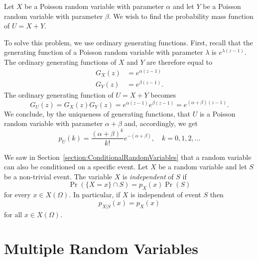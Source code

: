 \begin{example}
Let $X$ be a Poisson random variable with parameter $\alpha$ and let $Y$ be a Poisson random variable with parameter $\beta$.
We wish to find the probability mass function of $U = X + Y$.

To solve this problem, we use ordinary generating functions.
First, recall that the generating function of a Poisson random variable with parameter $\lambda$ is $e^{\lambda (z-1)}$.
The ordinary generating functions of $X$ and $Y$ are therefore equal to
\begin{align*}
G_X (z) &= e^{\alpha (z-1)} \\
G_Y (z) &= e^{\beta (z-1)} .
\end{align*}
The ordinary generating function of $U = X + Y$ becomes
\begin{equation*}
G_U (z) = G_X (z) G_Y(z) = e^{\alpha (z-1)} e^{\beta (z-1)}
= e^{(\alpha + \beta) (z-1)} .
\end{equation*}
We conclude, by the uniqueness of generating functions, that $U$ is a Poisson random variable with parameter $\alpha + \beta$ and, accordingly, we get
\begin{equation*}
p_U (k) = \frac{ (\alpha + \beta)^k }{k!} e^{- (\alpha + \beta) },
\quad k = 0, 1, 2, \ldots
\end{equation*}
\end{example}

We saw in Section~\ref{section:ConditionalRandomVariables} that a random variable can also be conditioned on a specific event.
Let $X$ be a random variable and let $S$ be a non-trivial event.
The variable $X$ is \emph{independent} of $S$ if
\begin{equation*}
\Pr (\{X = x \} \cap S ) = p_X (x) \Pr (S)
\end{equation*}
for every $x \in X(\Omega)$.
In particular, if $X$ is independent of event $S$ then
\begin{equation*}
p_{X|S} (x) = p_X (x)
\end{equation*}
for all $x \in X(\Omega)$.


\section{Multiple Random Variables}

